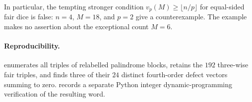 \documentclass[11pt]{article}
\begin{document}
In particular, the tempting stronger condition
$v_p(M)\ge\lfloor n/p\rfloor$ for equal-sided fair dice is false:
$n=4$, $M=18$, and $p=2$ give a counterexample. The example makes no
assertion about the exceptional count $M=6$.

\paragraph{Reproducibility.}
 enumerates all triples of relabelled
palindrome blocks, retains the $192$ three-wise fair triples, and finds
three of their $24$ distinct fourth-order defect vectors summing to zero.
 records a separate Python
integer dynamic-programming verification of the resulting word.
\end{document}
